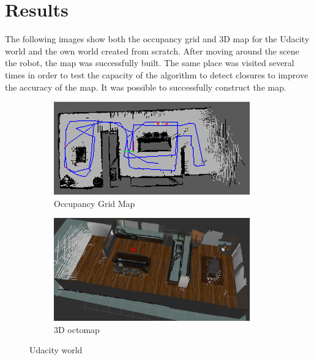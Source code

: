 \documentclass[10pt,journal,compsoc]{IEEEtran}
\begin{document}
\section{Results}

The following images show both the occupancy grid and 3D map for the Udacity world and the own world created from scratch. After moving around the scene the robot, the map was successfully built. The same place was visited several times in order to test the capacity of the algorithm to detect closures to improve the accuracy of the map. It was possible to successfully construct the map. 

\begin{figure}[h]
\centering
\begin{subfigure}[b]{0.2\textwidth}
\includegraphics[scale=0.3]{udacity-occupancy-grid}
\caption{Occupancy Grid Map}
\end{subfigure}
\begin{subfigure}[b]{0.2\textwidth}
\includegraphics[scale=0.3]{udacity-3d-map}
\caption{3D octomap}
\end{subfigure}
\caption{Udacity world}
\end{figure}
\end{document}

